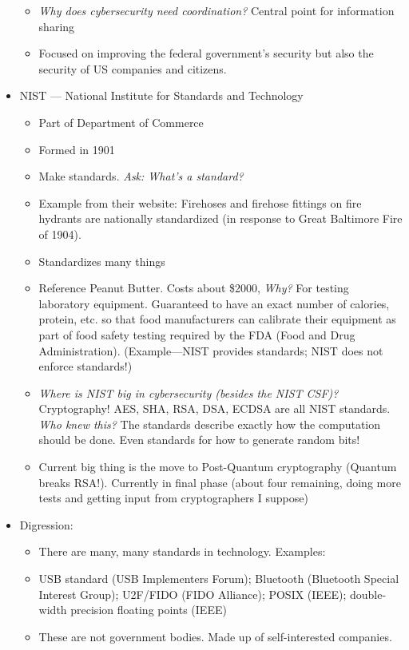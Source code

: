 \documentclass[11pt]{article}
\begin{document}
\begin{itemize}
\begin{itemize}
        \item {\it Why does cybersecurity need coordination?} Central point for information sharing
        \item Focused on improving the federal government's security but also the security of US companies and citizens. 
    \end{itemize}
    \item NIST --- National Institute for Standards and Technology
    \begin{itemize}
        \item Part of Department of Commerce
        \item Formed in 1901
        \item Make standards. {\it Ask: What's a standard?}
        \item Example from their website: Firehoses and firehose fittings on fire hydrants are nationally standardized (in response to Great Baltimore Fire of 1904).
        \item Standardizes many things 
        \item Reference Peanut Butter. Costs about \$2000, {\it Why?} For testing laboratory equipment. Guaranteed to have an exact number of calories, protein, etc. so that food manufacturers can calibrate their equipment as part of food safety testing required by the FDA (Food and Drug Administration). (Example---NIST provides standards; NIST does not enforce standards!)
        \item {\it Where is NIST big in cybersecurity (besides the NIST CSF)?} Cryptography! AES, SHA, RSA, DSA, ECDSA are all NIST standards. {\it Who knew this?} The standards describe exactly how the computation should be done. Even standards for how to generate random bits!
        \item Current big thing is the move to Post-Quantum cryptography (Quantum breaks RSA!). Currently in final phase (about four remaining, doing more tests and getting input from cryptographers I suppose)
    \end{itemize}
    \item Digression:
    \begin{itemize}
        \item There are many, many standards in technology. Examples:
        \item USB standard (USB Implementers Forum); Bluetooth (Bluetooth Special Interest Group); U2F/FIDO (FIDO Alliance); POSIX (IEEE); double-width precision floating points (IEEE)
        \item These are not government bodies. Made up of self-interested companies.

\end{itemize}
\end{itemize}
\end{document}
